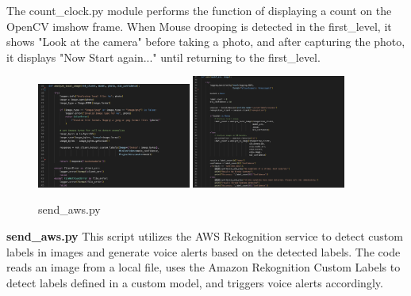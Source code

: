 The count\_clock.py module performs the function of displaying a count on the OpenCV imshow frame. When Mouse drooping is detected in the first\_level, it shows "Look at the camera" before taking a photo, and after capturing the photo, it displays "Now Start again..." until returning to the first\_level.\\

\begin{figure}[h]
  \centering
  \includegraphics[width=0.45\textwidth]{images/send_aws_1.png}
  \hspace{0.05\textwidth}
  \includegraphics[width=0.45\textwidth]{images/send_aws_2.png}
  \caption{send\_aws.py}
  \label{fig:twopics}
\end{figure}

\textbf{send\_aws.py}
This script utilizes the AWS Rekognition service to detect custom labels in images and generate voice alerts based on the detected labels. The code reads an image from a local file, uses the Amazon Rekognition Custom Labels to detect labels defined in a custom model, and triggers voice alerts accordingly.

